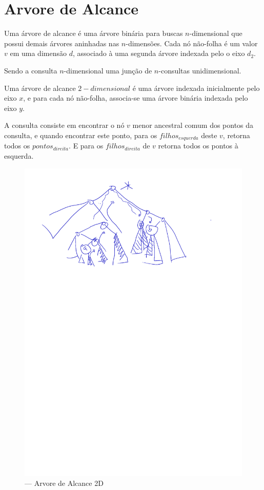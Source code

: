 \section{Arvore de Alcance}

Uma árvore de alcance é uma árvore binária para buscas $n$-dimensional que possui demais árvores aninhadas
nas $n$-dimensões.
Cada nó não-folha é um valor $v$ em uma dimensão $d$, associado à uma segunda árvore indexada pelo o 
eixo $d_2$.

Sendo a consulta $n$-dimensional uma junção de $n$-consultas unidimensional.

Uma árvore de alcance $2-dimensional$ é uma árvore indexada inicialmente pelo eixo $x$, e para cada
nó não-folha, associa-se uma árvore binária indexada pelo eixo $y$.

A consulta consiste em encontrar o nó $v$ menor ancestral comum dos pontos da consulta, e quando encontrar este
ponto, para os $filhos_{esquerda}$ deste $v$, retorna todos os $pontos_{direita}$. E para os $filhos_{direita}$
de $v$ retorna todos os pontos à esquerda.

\begin{figure}[htb]
    \caption{\label{fig:Fig_26} — Arvore de Alcance 2D}
    \begin{center}
        \includegraphics{images/range_tree.pdf}
    \end{center}
\end{figure}

